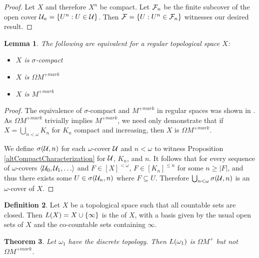 \documentclass{amsart}
\theoremstyle{plain}
\newtheorem{theorem}{Theorem}
\newtheorem{lemma}[theorem]{Lemma}
\theoremstyle{definition}
\newtheorem{definition}[theorem]{Definition}
\theoremstyle{remark}
\theoremstyle{plain}
\theoremstyle{definition}
\theoremstyle{remark}
\begin{document}
\begin{proof}
  Let \(X\) and therefore \(X^n\) be compact.
  Let \(\mathcal{F}_n\) be the finite subcover of the
  open cover \(\mathcal{U}_n=\{U^n:U\in\mathcal{U}\}\). Then
  \(\mathcal{F}=\{U:U^n\in\mathcal{F}_n\}\) witnesses our desired result.
\end{proof}

\begin{lemma}
  The following are equivalent for a regular topological space \(X\):
  \begin{itemize}
    \item \(X\) is \(\sigma\)-compact
    \item \(X\) is \(\Omega M^{+mark}\)
    \item \(X\) is \(M^{+mark}\)
  \end{itemize}
\end{lemma}

\begin{proof}
  The equivalence of \(\sigma\)-compact and \(M^{+mark}\) in regular spaces
  was shown in \cite{clontzMengerGamePreprint}. As \(\Omega M^{+mark}\)
  trivially implies \(M^{+mark}\), we need only demonstrate that
  if \(X=\bigcup_{n<\omega} K_n\) for \(K_n\) compact and increasing,
  then \(X\) is \(\Omega M^{+mark}\).

  We define \(\sigma(\mathcal{U},n)\) for each \(\omega\)-cover \(\mathcal{U}\) and
  \(n<\omega\) to witness Proposition \ref{altCompactCharacterization}
  for \(\mathcal{U}\), \(K_n\), and \(n\). It follows that for every sequence of
  \(\omega\)-covers \(\<\mc U_0,\mc U_1,\dots\>\) and \(F\in[X]^{<\omega}\),
  \(F\in[K_n]^{\leq n}\) for some \(n\geq|F|\), and thus there exists some
  \(U\in\sigma(\mathcal{U}_n,n)\) where \(F\subseteq U\). Therefore
  \(\bigcup_{n<\omega}\sigma(\mathcal{U},n)\) is an \(\omega\)-cover of \(X\).
\end{proof}

\begin{definition}
  Let \(X\) be a topological space such that all countable sets are
  closed. Then \(L(X)=X\cup\{\infty\}\)
  is the  of \(X\), with a basis given
  by the usual open sets of \(X\) and the co-countable sets containing
  \(\infty\).
\end{definition}

\begin{theorem}
  Let \(\omega_1\) have the discrete topology. Then
  \(L(\omega_1)\) is \(\Omega M^+\) but not \(\Omega M^{+mark}\).
\end{theorem}
\end{document}
